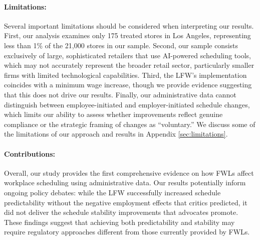 \documentclass[letterpaper,11pt,leqno]{article}
\theoremstyle{paper}
\begin{document}
\paragraph{Limitations:} Several important limitations should be considered when interpreting our results. First, our analysis examines only 175 treated stores in Los Angeles, representing less than 1\% of the 21,000 stores in our sample. Second, our sample consists exclusively of large, sophisticated retailers that use AI-powered scheduling tools, which may not accurately represent the broader retail sector, particularly smaller firms with limited technological capabilities. Third, the LFW's implementation coincides with a minimum wage increase, though we provide evidence suggesting that this does not drive our results. Finally, our administrative data cannot distinguish between employee-initiated and employer-initiated schedule changes, which limits our ability to assess whether improvements reflect genuine compliance or the strategic framing of changes as ``voluntary.'' We discuss some of the limitations of our approach and results in Appendix \ref{sec:limitations}.

\paragraph{Contributions:}
Overall, our study provides the first comprehensive evidence on how FWLs affect workplace scheduling using administrative data. Our results potentially inform ongoing policy debates: while the LFW successfully increased schedule predictability without the negative employment effects that critics predicted, it did not deliver the schedule stability improvements that advocates promote. These findings suggest that achieving both predictability and stability may require regulatory approaches different from those currently provided by FWLs.
\end{document}
